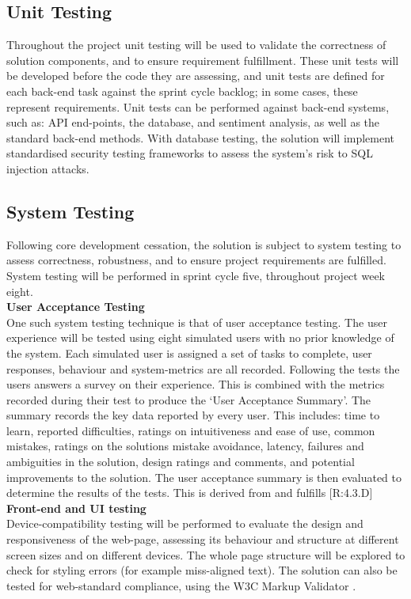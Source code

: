 \documentclass[9pt, titlepage]{extarticle}
\begin{document}
\subsection{Unit Testing}

Throughout the project unit testing will be used to validate the correctness of solution components, and to ensure requirement fulfillment. These unit tests will be developed before the code they are assessing, and unit tests are defined for each back-end task against the sprint cycle backlog; in some cases, these represent requirements. Unit tests can be performed against back-end systems, such as: API end-points, the database, and sentiment analysis, as well as the standard back-end methods. With database testing, the solution will implement standardised security testing frameworks to assess the system's risk to SQL injection attacks.

\subsection{System Testing}

Following core development cessation, the solution is subject to system testing to assess correctness, robustness, and to ensure project requirements are fulfilled. System testing will be performed in sprint cycle five, throughout project week eight.\\

\textbf{User Acceptance Testing}\\
One such system testing technique is that of user acceptance testing. The user experience will be tested using eight simulated users with no prior knowledge of the system. Each simulated user is assigned a set of tasks to complete, user responses, behaviour and system-metrics are all recorded. Following the tests the users answers a survey on their experience. This is combined with the metrics recorded during their test to produce the `User Acceptance Summary'. The summary records the key data reported by every user. This includes: time to learn, reported difficulties, ratings on intuitiveness and ease of use, common mistakes, ratings on the solutions mistake avoidance, latency, failures and ambiguities in the solution, design ratings and comments, and potential improvements to the solution. The user acceptance summary is then evaluated to determine the results of the tests. This is derived from and fulfills [R:4.3.D]\\

\textbf{Front-end and UI testing}\\
Device-compatibility testing will be performed to evaluate the design and responsiveness of the web-page, assessing its behaviour and structure at different screen sizes and on different devices. The whole page structure will be explored to check for styling errors (for example miss-aligned text). The solution can also be tested for web-standard compliance, using the W3C Markup Validator \autocite{web:w3c}. \\
\end{document}
